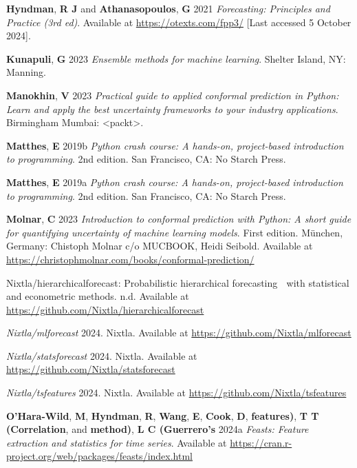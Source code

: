 \documentclass[
  american,
  10,
  a4paper,
]{book}
\newlength{\cslhangindent}
\newenvironment{CSLReferences}[2] %
 {\begin{list}{}{%
  \setlength{\itemindent}{0pt}
  \setlength{\leftmargin}{0pt}
  \setlength{\parsep}{0pt}
  \ifodd #1
   \setlength{\leftmargin}{\cslhangindent}
   \setlength{\itemindent}{-1\cslhangindent}
  \fi
  \setlength{\itemsep}{#2\baselineskip}}}
 {\end{list}}
\theoremstyle{definition}
\theoremstyle{remark}
\begin{document}
\begin{CSLReferences}{0}{0}
\textbf{Hyndman}, \textbf{R J} and \textbf{Athanasopoulos}, \textbf{G}
2021 \emph{Forecasting: {Principles} and {Practice} (3rd ed)}. Available
at \url{https://otexts.com/fpp3/} {[}Last accessed 5 October 2024{]}.

\textbf{Kunapuli}, \textbf{G} 2023 \emph{Ensemble methods for machine
learning}. Shelter Island, NY: Manning.

\textbf{Manokhin}, \textbf{V} 2023 \emph{Practical guide to applied
conformal prediction in {Python}: Learn and apply the best uncertainty
frameworks to your industry applications}. Birmingham Mumbai:
{\textless{}}packt{\textgreater{}}.

\textbf{Matthes}, \textbf{E} 2019b \emph{Python crash course: A
hands-on, project-based introduction to programming}. 2nd edition. San
Francisco, CA: No Starch Press.

\textbf{Matthes}, \textbf{E} 2019a \emph{Python crash course: A
hands-on, project-based introduction to programming}. 2nd edition. San
Francisco, CA: No Starch Press.

\textbf{Molnar}, \textbf{C} 2023 \emph{Introduction to conformal
prediction with {Python}: A short guide for quantifying uncertainty of
machine learning models}. First edition. München, Germany: Chistoph
Molnar c/o MUCBOOK, Heidi Seibold. Available at
\url{https://christophmolnar.com/books/conformal-prediction/}

Nixtla/hierarchicalforecast: Probabilistic hierarchical forecasting 👑
with statistical and econometric methods. n.d. Available at
\url{https://github.com/Nixtla/hierarchicalforecast}

\emph{Nixtla/mlforecast} 2024. Nixtla. Available at
\url{https://github.com/Nixtla/mlforecast}

\emph{Nixtla/statsforecast} 2024. Nixtla. Available at
\url{https://github.com/Nixtla/statsforecast}

\emph{Nixtla/tsfeatures} 2024. Nixtla. Available at
\url{https://github.com/Nixtla/tsfeatures}

\textbf{O'Hara-Wild}, \textbf{M}, \textbf{Hyndman}, \textbf{R},
\textbf{Wang}, \textbf{E}, \textbf{Cook}, \textbf{D},
\textbf{features)}, \textbf{T T (Correlation}, and \textbf{method)},
\textbf{L C (Guerrero's} 2024a \emph{Feasts: Feature extraction and
statistics for time series}. Available at
\url{https://cran.r-project.org/web/packages/feasts/index.html}


\end{CSLReferences}
\end{document}
